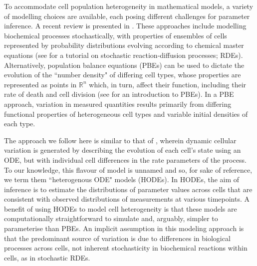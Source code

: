 To accommodate cell population heterogeneity in mathematical models, a variety of modelling choices are available, each posing different challenges for parameter inference. A recent review is presented in \cite{waldherr2018estimation}. These approaches include modelling biochemical processes stochastically, with properties of ensembles of cells represented by probability distributions evolving according to chemical master equations (see \cite{erban2007practical} for a tutorial on stochastic reaction-diffusion processes; RDEs). Alternatively, population balance equations (PBEs) can be used to dictate the evolution of the ``number density" of differing cell types, whose properties are represented as points in $\mathbb{R}^n$ which, in turn, affect their function, including their rate of death and cell division (see \cite{ramkrishna2014population} for an introduction to PBEs). In a PBE approach, variation in measured quantities results primarily from differing functional properties of heterogeneous cell types and variable initial densities of each type.

The approach we follow here is similar to that of \cite{dixit2018maximum}, wherein dynamic cellular variation is generated by describing the evolution of each cell's state using an ODE, but with individual cell differences in the rate parameters of the process. To our knowledge, this flavour of model is unnamed and so, for sake of reference, we term them ``heterogenous ODE" models (HODEs). In HODEs, the aim of inference is to estimate the distributions of parameter values across cells that are consistent with observed distributions of measurements at various timepoints. A benefit of using HODEs to model cell heterogeneity is that these models are computationally straightforward to simulate and, arguably, simpler to parameterise than PBEs. An implicit assumption in this modeling approach is that the predominant source of variation is due to differences in biological processes across cells, not inherent stochasticity in biochemical reactions within cells, as in stochastic RDEs.

